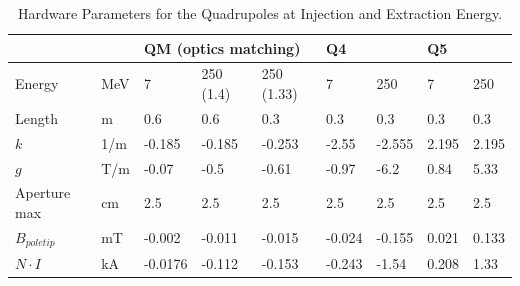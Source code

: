       \begin{center}
        \begin{table}[]
          \caption{Hardware Parameters for the Quadrupoles at Injection and Extraction Energy.}
          \begin{tabular}{@{}lllllllll@{}}
                  \toprule
                  &      & \multicolumn{3}{l}{QM (optics matching)} & \multicolumn{2}{l}{Q4} & \multicolumn{2}{l}{Q5} \\ \midrule
                  Energy      & MeV  & 7   & 250 (1.4) & 250 (1.33) & 7     & 250     & 7      & 250     \\
                  Length        & m    & 0.6     & 0.6           & 0.3            & 0.3       & 0.3        & 0.3       & 0.3        \\
                  $k$           & 1/m  & -0.185  & -0.185        & -0.253         & -2.55     & -2.555     & 2.195     & 2.195      \\
                  $g$           & T/m  & -0.07   & -0.5          & -0.61          & -0.97     & -6.2       & 0.84      & 5.33       \\
                  Aperture max  & cm   & 2.5     & 2.5           &  2.5              & 2.5       & 2.5        & 2.5       & 2.5        \\
                  $B_{poletip}$ & mT   & -0.002  & -0.011        & -0.015         & -0.024    & -0.155     & 0.021     & 0.133      \\
                  $N \cdot I$   & kA   & -0.0176 & -0.112        & -0.153         & -0.243    & -1.54      & 0.208     & 1.33       \\ \bottomrule
                \end{tabular}
                \label{tab:quad}
              \end{table}

            \end{center}


